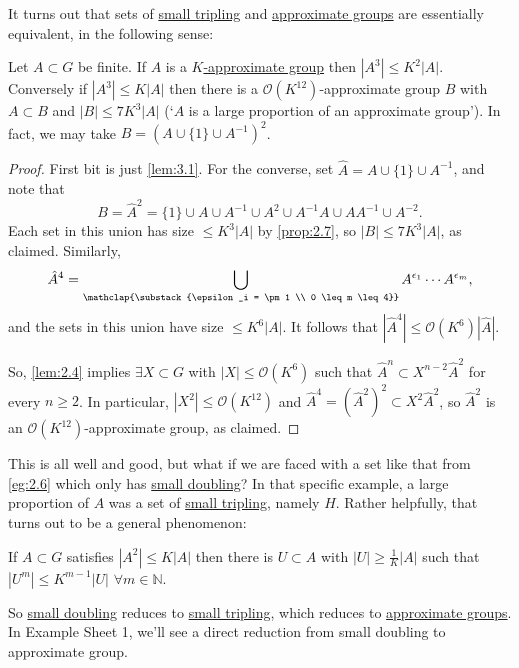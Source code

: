 \documentclass{article}
\numberwithin{equation}{section}
\begin{document}
It turns out that sets of \hyperlink{def:tripling}{small tripling} and \hyperlink{def:appGroup}{approximate groups} are essentially equivalent, in the following sense:
\begin{nprop}\label{prop:3.2}
  Let $A \subset G$ be finite.
  If $A$ is a \hyperlink{def:appGroup}{$K$-approximate group} then $|A^3| \leq K^2 |A|$.
  Conversely if $|A^3| \leq K|A|$ then there is a $\mathcal{O}(K^{12})$-approximate group $B$ with $A \subset B$ and $|B| \leq 7 K^3 |A|$ (`$A$ is a large proportion of an approximate group').
  In fact, we may take $B = (A \cup \{1\} \cup A^{-1})^2$.
\end{nprop}
\begin{proof}
  First bit is just \cref{lem:3.1}. For the converse, set $\hat{A} = A \cup \{1\} \cup A^{-1}$, and note that
  \begin{equation*}
    B = \hat{A}^2 = \{1\} \cup A \cup A^{-1} \cup A^2 \cup A^{-1} A \cup A A^{-1} \cup A^{-2}.
  \end{equation*}
  Each set in this union has size $\leq K^3 |A|$ by \cref{prop:2.7}, so $|B| \leq 7 K^3 |A|$, as claimed. Similarly,
  \begin{equation*}
    \hat{A}^4 = \bigcup_{\mathclap{\substack{\epsilon_i = \pm 1 \\ 0 \leq m \leq 4}}} A^{\epsilon_1} \dotsm A^{\epsilon_m},
  \end{equation*}
  and the sets in this union have size $\leq K^6 |A|$.
  It follows that $|\hat{A}^4| \leq \mathcal{O}(K^6)|\hat{A}|$.

  So, \cref{lem:2.4} implies $\exists X \subset G$ with $|X| \leq \mathcal{O}(K^6)$ such that $\hat{A}^n \subset X^{n-2} \hat{A}^2$ for every $n \geq 2$.
  In particular, $|X^2| \leq \mathcal{O}(K^{12})$ and $\hat{A}^4 = (\hat{A}^2)^2 \subset X^2 \hat{A}^2$, so $\hat{A}^2$ is an $\mathcal{O}(K^{12})$-approximate group, as claimed.
\end{proof}
This is all well and good, but what if we are faced with a set like that from \cref{eg:2.6} which only has \hyperlink{def:doubling}{small doubling}?
In that specific example, a large proportion of $A$ was a set of \hyperlink{def:tripling}{small tripling}, namely $H$. Rather helpfully, that turns out to be a general phenomenon:

\begin{nthm}\label{thm:3.3}
  If $A \subset G$ satisfies $|A^2| \leq K|A|$ then there is $U \subset A$ with $|U| \geq \frac{1}{K} |A|$ such that $|U^m| \leq K^{m-1} |U|$ $\forall m \in \mathbb{N}$.
\end{nthm}
So \hyperlink{def:doubling}{small doubling} reduces to \hyperlink{def:tripling}{small tripling}, which reduces to \hyperlink{def:appGroup}{approximate groups}. In Example Sheet 1, we'll see a direct reduction from small doubling to approximate group.
\end{document}
